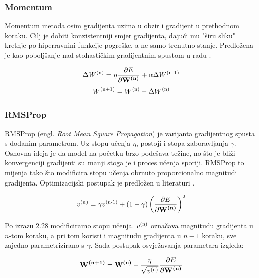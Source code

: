 \documentclass[times, utf8, diplomski]{fer}
\begin{document}
\subsubsection{Momentum}
Momentum metoda osim gradijenta uzima u obzir i gradijent u prethodnom koraku. Cilj je dobiti konzistentniji smjer gradijenta, dajući mu "širu sliku" kretnje po hiperravnini funkcije pogreške, a ne samo trenutno stanje. Predložena je kao poboljšanje nad stohastičkim gradijentnim spustom u radu \cite{backprop}.

\begin{equation}
\Delta W\textsuperscript{(n)} = \eta\frac{\partial E}{\partial \textbf{W\textsuperscript{(n)}}} + \alpha \Delta W\textsuperscript{(n-1)}
\end{equation}
\begin{equation}
W\textsuperscript{(n+1)} = W\textsuperscript{(n)} - \Delta W\textsuperscript{(n)}
\end{equation}

\subsubsection{RMSProp}
RMSProp (engl. \textit{Root Mean Square Propagation}) je varijanta gradijentnog spusta s dodanim parametrom. Uz stopu učenja $\eta$, postoji i stopa zaboravljanja $\gamma$. Osnovna ideja je da model na početku brzo podešava težine, no što je bliži konvergenciji gradijenti su manji stoga je i proces učenja sporiji. RMSProp to mijenja tako što modificira stopu učenja obrnuto proporcionalno magnitudi gradijenta. Optimizacijski postupak je predložen u literaturi \cite{rmsprop}.

\begin{equation}
v\textsuperscript{(n)} = \gamma v\textsuperscript{(n-1)} + (1-\gamma)\left(\frac{\partial E}{\partial \textbf{W\textsuperscript{(n)}}}\right)^2
\end{equation}

Po izrazu 2.28 modificiramo stopu učenja. $v\textsuperscript{(n)}$ označava magnitudu gradijenta u $n$-tom koraku, a pri tom koristi i magnitudu gradijenta u $n-1$ koraku, sve zajedno parametrizirano s $\gamma$. Sada postupak osvježavanja parametara izgleda:

\begin{equation}
\textbf{W\textsuperscript{(n+1)}} = \textbf{W\textsuperscript{(n)}} - \frac{\eta}{\sqrt{v\textsuperscript{(n)}}}\frac{\partial E}{\partial \textbf{W\textsuperscript{(n)}}}
\end{equation}
\end{document}
